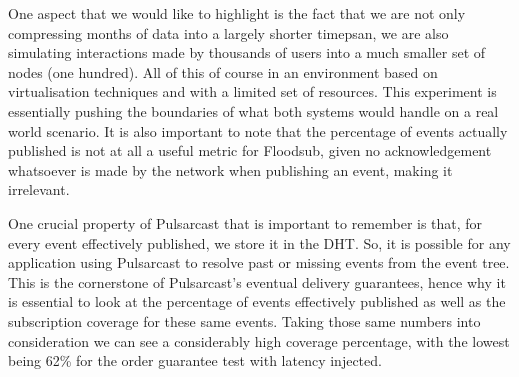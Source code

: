 One aspect that we would like to highlight is the fact that we are not only
compressing months of data into a largely shorter timepsan, we are also
simulating interactions made by thousands of users into a much smaller set of
nodes (one hundred). All of this of course in an environment based on
virtualisation techniques and with a limited set of resources. This experiment
is essentially pushing the boundaries of what both systems would handle on a
real world scenario. It is also important to note that the percentage of events
actually published is not at all a useful metric for Floodsub, given no
acknowledgement whatsoever is made by the network when publishing an event,
making it irrelevant.

One crucial property of Pulsarcast that is important to remember is
that, for every event effectively published, we store it in the DHT.
So, it is possible for any application using Pulsarcast to resolve past or
missing events from the event tree. This is the cornerstone of Pulsarcast's
eventual delivery guarantees, hence why it is essential to look at the
percentage of events effectively published as well as the subscription coverage
for these same events. Taking those same numbers into consideration we can see
a considerably high coverage percentage, with the lowest being 62\% for the
order guarantee test with latency injected.
